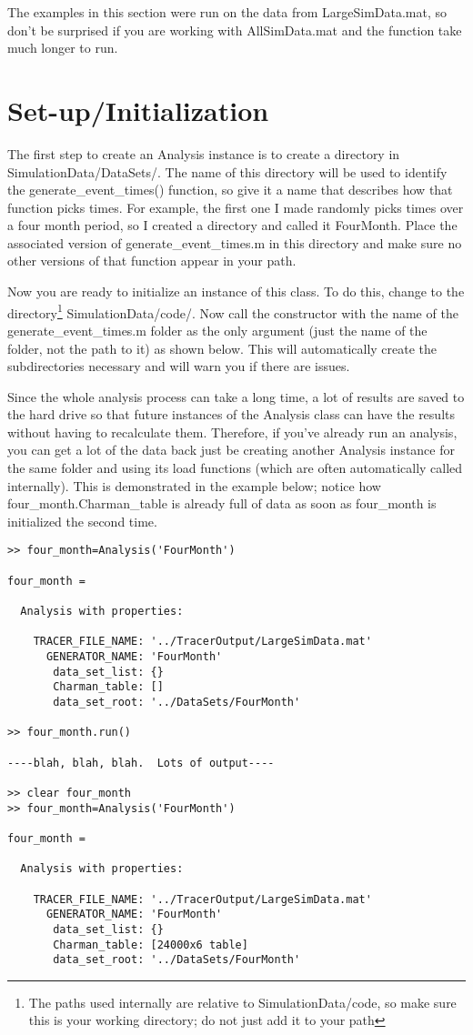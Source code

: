 \documentclass[12pt]{report}
\begin{document}
The examples in this section were run on the data from LargeSimData.mat, so don't be surprised if you are working with AllSimData.mat and the function take much longer to run.

\section{Set-up/Initialization}
The first step to create an Analysis instance is to create a directory in SimulationData/DataSets/.  The name of this directory will be used to identify the generate\_event\_times() function, so give it a name that describes how that function picks times.  For example, the first one I made randomly picks times over a four month period, so I created a directory and called it FourMonth.  Place the associated version of generate\_event\_times.m in this directory and make sure no other versions of that function appear in your path.

Now you are ready to initialize an instance of this class.  To do this, change to the directory\footnote{The paths used internally are relative to SimulationData/code, so make sure this is your working directory; do not just add it to your path} SimulationData/code/.  Now call the constructor with the name of the generate\_event\_times.m folder as the only argument (just the name of the folder, not the path to it) as shown below.  This will automatically create the subdirectories necessary and will warn you if there are issues.

Since the whole analysis process can take a long time, a lot of results are saved to the hard drive so that future instances of the Analysis class can have the results without having to recalculate them.  Therefore, if you've already run an analysis, you can get a lot of the data back just be creating another Analysis instance for the same folder and using its load functions (which are often automatically called internally).  This is demonstrated in the example below; notice how four\_month.Charman\_table is already full of data as soon as four\_month is initialized the second time.

\begin{verbatim}
>> four_month=Analysis('FourMonth')

four_month = 

  Analysis with properties:

    TRACER_FILE_NAME: '../TracerOutput/LargeSimData.mat'
      GENERATOR_NAME: 'FourMonth'
       data_set_list: {}
       Charman_table: []
       data_set_root: '../DataSets/FourMonth'

>> four_month.run()

----blah, blah, blah.  Lots of output----
 
>> clear four_month
>> four_month=Analysis('FourMonth')

four_month = 

  Analysis with properties:

    TRACER_FILE_NAME: '../TracerOutput/LargeSimData.mat'
      GENERATOR_NAME: 'FourMonth'
       data_set_list: {}
       Charman_table: [24000x6 table]
       data_set_root: '../DataSets/FourMonth'
\end{verbatim}
\end{document}
